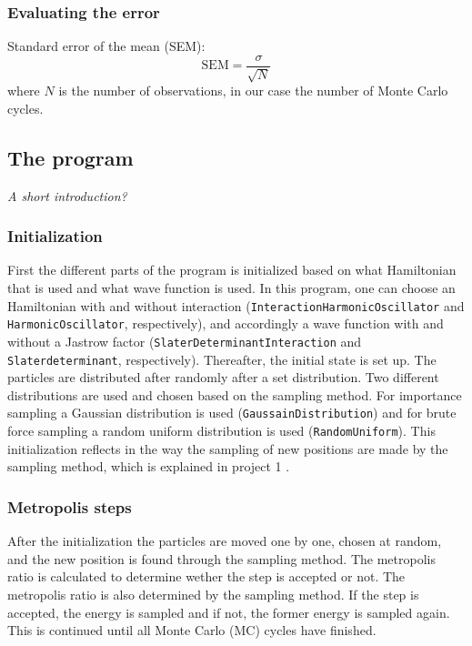 \subsubsection{Evaluating the error}

Standard error of the mean (SEM):
\begin{equation}
\text{SEM} = \frac{\sigma}{\sqrt{N}}
\end{equation}
where $N$ is the number of observations, in our case the number of Monte Carlo cycles.

\subsection{The program}

\textit{A short introduction?}

\subsubsection{Initialization}

First the different parts of the program is initialized based on what Hamiltonian that is used and what wave function is used. In this program, one can choose an Hamiltonian with and without interaction (\texttt{InteractionHarmonicOscillator} and \texttt{HarmonicOscillator}, respectively), and accordingly a wave function with and without a Jastrow factor (\texttt{SlaterDeterminantInteraction} and \texttt{Slaterdeterminant}, respectively). Thereafter, the initial state is set up. The particles are distributed after randomly after a set distribution. Two different distributions are used and chosen based on the sampling method. For importance sampling a Gaussian distribution is used (\texttt{GaussainDistribution}) and for brute force sampling a random uniform distribution is used (\texttt{RandomUniform}). This initialization reflects in the way the sampling of new positions are made by the sampling method, which is explained in project 1 \cite{project1}.

\subsubsection{Metropolis steps}

After the initialization the particles are moved one by one, chosen at random, and the new position is found through the sampling method. The metropolis ratio is calculated to determine wether the step is accepted or not. The metropolis ratio is also determined by the sampling method. If the step is accepted, the energy is sampled and if not, the former energy is sampled again. This is continued until all Monte Carlo (MC) cycles have finished. 

